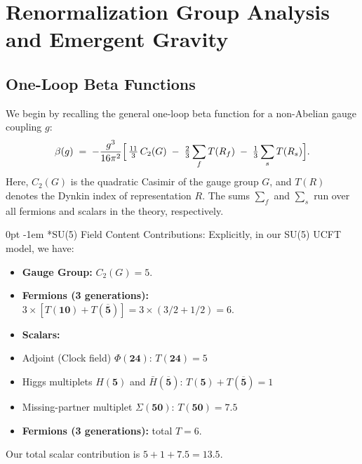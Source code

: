 \documentclass[aps,prd,preprint,groupedaddress]{revtex4-2}
\makeatletter
\renewcommand{\paragraph}[1]{%
  \@startsection{paragraph}{4}{\z@}%
    {0pt}%
    {-1em}%
    {\normalfont\normalsize\itshape}*{#1}}
\makeatother
\begin{document}
\section{Renormalization Group Analysis and Emergent Gravity}
\label{sec:RGE-and-gravity}

\subsection{One-Loop Beta Functions}
\label{subsec:one-loop}

We begin by recalling the general one-loop beta function for a non-Abelian gauge coupling \(g\):
\begin{equation}
\beta(g) \;=\; -\frac{g^3}{16\pi^2}
\Bigl[
\,\tfrac{11}{3}\,C_2(G)
\;-\;
\tfrac{2}{3}\sum_{f} T(R_f)
\;-\;
\tfrac{1}{3}\sum_{s} T(R_s)
\Bigr].
\label{eq:beta-nonabelian-general}
\end{equation}
Here, \(C_2(G)\) is the quadratic Casimir of the gauge group \(G\), and \(T(R)\) denotes the Dynkin index of representation \(R\).  The sums \(\sum_{f}\) and \(\sum_{s}\) run over all fermions and scalars in the theory, respectively.

\paragraph{SU(5) Field Content Contributions:}
Explicitly, in our SU(5) UCFT model, we have:
\begin{itemize}
\item \textbf{Gauge Group:} \(C_2(G)=5\).
\item \textbf{Fermions (3 generations):} \(3 \times [T(\mathbf{10})+T(\mathbf{\overline{5}})] = 3\times(3/2+1/2)=6\).
\item \textbf{Scalars:}
\item Adjoint (Clock field) \(\Phi(\mathbf{24})\): \(T(\mathbf{24})=5\)
\item Higgs multiplets \(H(\mathbf{5})\) and \(\bar{H}(\overline{\mathbf{5}})\): \(T(\mathbf{5})+T(\mathbf{\overline{5}})=1\)
\item Missing-partner multiplet \(\Sigma(\mathbf{50})\): \(T(\mathbf{50})=7.5\)
\item \textbf{Fermions (3 generations):} total \(T=6\).
\end{itemize}
Our total scalar contribution is \(5+1+7.5=13.5\).
\end{document}
